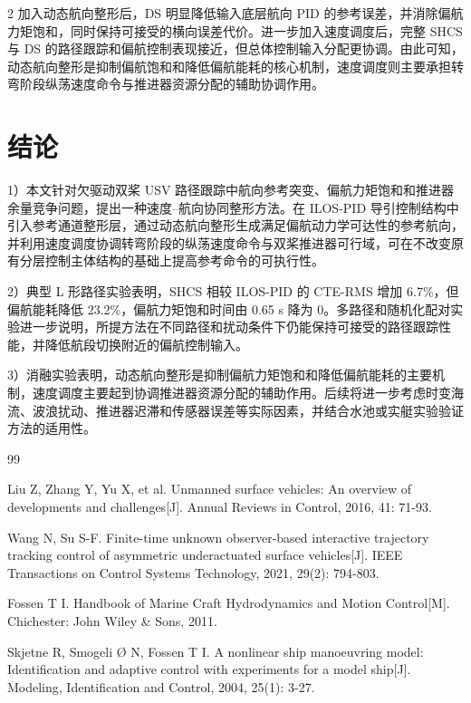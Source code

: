 \documentclass[authordraft]{ctacn}
\begin{document}
\begin{multicols}{2}
加入动态航向整形后，DS 明显降低输入底层航向 PID 的参考误差，并消除偏航力矩饱和，同时保持可接受的横向误差代价。进一步加入速度调度后，完整 SHCS 与 DS 的路径跟踪和偏航控制表现接近，但总体控制输入分配更协调。由此可知，动态航向整形是抑制偏航饱和和降低偏航能耗的核心机制，速度调度则主要承担转弯阶段纵荡速度命令与推进器资源分配的辅助协调作用。

\section{结论}
1）本文针对欠驱动双桨 USV 路径跟踪中航向参考突变、偏航力矩饱和和推进器余量竞争问题，提出一种速度–航向协同整形方法。在 ILOS-PID 导引控制结构中引入参考通道整形层，通过动态航向整形生成满足偏航动力学可达性的参考航向，并利用速度调度协调转弯阶段的纵荡速度命令与双桨推进器可行域，可在不改变原有分层控制主体结构的基础上提高参考命令的可执行性。

2）典型 L 形路径实验表明，SHCS 相较 ILOS-PID 的 CTE-RMS 增加 6.7\%，但偏航能耗降低 23.2\%，偏航力矩饱和时间由 0.65 s 降为 0。多路径和随机化配对实验进一步说明，所提方法在不同路径和扰动条件下仍能保持可接受的路径跟踪性能，并降低航段切换附近的偏航控制输入。

3）消融实验表明，动态航向整形是抑制偏航力矩饱和和降低偏航能耗的主要机制，速度调度主要起到协调推进器资源分配的辅助作用。后续将进一步考虑时变海流、波浪扰动、推进器迟滞和传感器误差等实际因素，并结合水池或实艇实验验证方法的适用性。

\vspace{12pt}

\begin{thebibliography}{99}
\addtolength{\itemsep}{-0.7em}

Liu Z, Zhang Y, Yu X, et al. Unmanned surface vehicles: An overview of developments and challenges[J]. Annual Reviews in Control, 2016, 41: 71-93.

Wang N, Su S-F. Finite-time unknown observer-based interactive trajectory tracking control of asymmetric underactuated surface vehicles[J]. IEEE Transactions on Control Systems Technology, 2021, 29(2): 794-803.

Fossen T I. Handbook of Marine Craft Hydrodynamics and Motion Control[M]. Chichester: John Wiley \& Sons, 2011.

Skjetne R, Smogeli {\O} N, Fossen T I. A nonlinear ship manoeuvring model: Identification and adaptive control with experiments for a model ship[J]. Modeling, Identification and Control, 2004, 25(1): 3-27.


\end{thebibliography}
\end{multicols}
\end{document}
